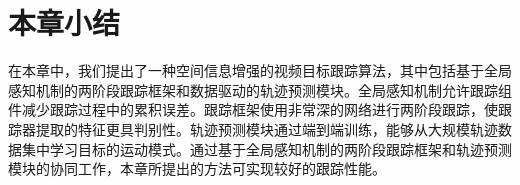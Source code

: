 \section{本章小结}
在本章中，我们提出了一种空间信息增强的视频目标跟踪算法，其中包括基于全局感知机制的两阶段跟踪框架和数据驱动的轨迹预测模块。全局感知机制允许跟踪组件减少跟踪过程中的累积误差。跟踪框架使用非常深的网络进行两阶段跟踪，使跟踪器提取的特征更具判别性。轨迹预测模块通过端到端训练，能够从大规模轨迹数据集中学习目标的运动模式。通过基于全局感知机制的两阶段跟踪框架和轨迹预测模块的协同工作，本章所提出的方法可实现较好的跟踪性能。